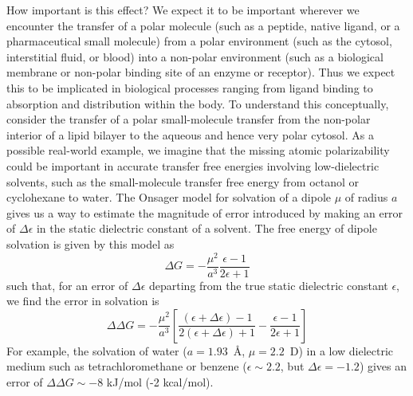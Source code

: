 \documentclass[aip, jcp, reprint]{revtex4-1}  %
\begin{document}
How important is this effect?
We expect it to be important wherever we encounter the transfer of a polar molecule (such as a peptide, native ligand, or a pharmaceutical small molecule) from a polar environment (such as the cytosol, interstitial fluid, or blood) into a non-polar environment (such as a biological membrane or non-polar binding site of an enzyme or receptor). Thus we expect this to be implicated in biological processes ranging from ligand binding to absorption and distribution within the body. To understand this conceptually, consider the transfer of a polar small-molecule transfer from the non-polar interior of a lipid bilayer to the aqueous and hence very polar cytosol.
As a possible real-world example, we imagine that the missing atomic polarizability could be important in accurate transfer free energies involving low-dielectric solvents, such as the small-molecule transfer free energy from octanol or cyclohexane to water.  
The Onsager model for solvation of a dipole $\mu$ of radius $a$ gives us a way to estimate the magnitude of error introduced by making an error of $\Delta \epsilon$ in the static dielectric constant of a solvent.
The free energy of dipole solvation is given by this model as
\begin{equation} \label{eq:onsager}
\Delta G = -\frac{\mu^2}{a^3}\frac{\epsilon - 1}{2 \epsilon + 1}
\end{equation}
such that, for an error of $\Delta \epsilon$ departing from the true static dielectric constant $\epsilon$, we find the error in solvation is
\begin{equation} \label{equation:onsager-error}
\Delta \Delta G = -\frac{\mu^2}{a^3} \left[ \frac{(\epsilon+\Delta \epsilon) - 1}{2 (\epsilon+\Delta \epsilon) + 1} - \frac{\epsilon - 1}{2 \epsilon + 1} \right] 
\end{equation}
For example, the solvation of water ($a = 1.93$~\AA, $\mu = 2.2$~D) in a low dielectric medium such as tetrachloromethane or benzene ($\epsilon \sim 2.2$, but $\Delta \epsilon = -1.2$) gives an error of $\Delta \Delta G \sim -8$ kJ/mol (-2 kcal/mol).
\end{document}
